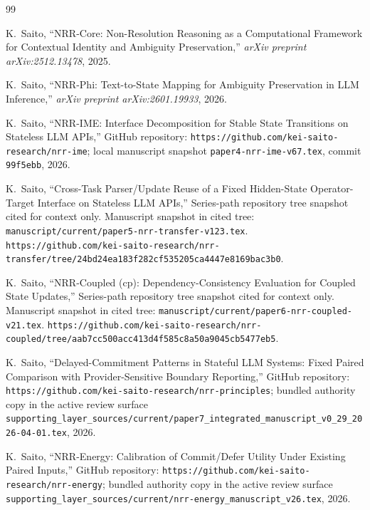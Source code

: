 \documentclass[11pt]{article}
\begin{document}
\begin{thebibliography}{99}
\raggedright

K.~Saito,
\newblock ``NRR-Core: Non-Resolution Reasoning as a Computational Framework for Contextual Identity and Ambiguity Preservation,''
\newblock \emph{arXiv preprint arXiv:2512.13478}, 2025.

K.~Saito,
\newblock ``NRR-Phi: Text-to-State Mapping for Ambiguity Preservation in LLM Inference,''
\newblock \emph{arXiv preprint arXiv:2601.19933}, 2026.

K.~Saito,
\newblock ``NRR-IME: Interface Decomposition for Stable State Transitions on Stateless LLM APIs,''
\newblock GitHub repository: \texttt{https://github.com/kei-saito-research/nrr-ime}; local manuscript snapshot \texttt{paper4-nrr-ime-v67.tex}, commit \texttt{99f5ebb}, 2026.

K.~Saito,
\newblock ``Cross-Task Parser/Update Reuse of a Fixed Hidden-State Operator-Target Interface on Stateless LLM APIs,''
\newblock Series-path repository tree snapshot cited for context only. Manuscript snapshot in cited tree:
\texttt{manuscript/current/paper5-nrr-transfer-v123.tex}. \texttt{https://github.com/kei-saito-research/nrr-transfer/tree/24bd24ea183f282cf535205ca4447e8169bac3b0}.

K.~Saito,
\newblock ``NRR-Coupled (cp): Dependency-Consistency Evaluation for Coupled State Updates,''
\newblock Series-path repository tree snapshot cited for context only. Manuscript snapshot in cited tree:
\texttt{manuscript/current/paper6-nrr-coupled-v21.tex}.
\texttt{https://github.com/kei-saito-research/nrr-coupled/tree/aab7cc500acc413d4f585c8a50a9045cb5477eb5}.

K.~Saito,
\newblock ``Delayed-Commitment Patterns in Stateful LLM Systems: Fixed Paired Comparison with Provider-Sensitive Boundary Reporting,''
\newblock GitHub repository: \texttt{https://github.com/kei-saito-research/nrr-principles}; bundled authority copy in the active review surface \texttt{supporting\_layer\_sources/current/paper7\_integrated\_manuscript\_v0\_29\_2026-04-01.tex}, 2026.

K.~Saito,
\newblock ``NRR-Energy: Calibration of Commit/Defer Utility Under Existing Paired Inputs,''
\newblock GitHub repository: \texttt{https://github.com/kei-saito-research/nrr-energy}; bundled authority copy in the active review surface \texttt{supporting\_layer\_sources/current/nrr-energy\_manuscript\_v26.tex}, 2026.


\end{thebibliography}
\end{document}
